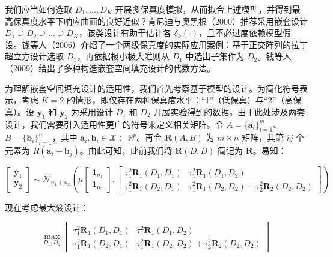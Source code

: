 \documentclass{ctexart}
\begin{document}
我们应当如何选取 $D_1,\dots,D_K$ 开展多保真度模拟，从而拟合上述模型，并得到最高保真度水平下响应曲面的良好近似？肯尼迪与奥黑根（2000）推荐采用嵌套设计 $D_1 \supseteq D_2 \supseteq \dots \supseteq D_K$，该类设计有助于估计各 $\delta_k(\cdot)$，且不必过度依赖模型假设。钱等人（2006）介绍了一个两级保真度的实际应用案例：基于正交阵列的拉丁超立方设计选取 $D_1$，再依据极小极大准则从 $D_1$ 中选出子集作为 $D_2$。钱等人（2009）给出了多种构造嵌套空间填充设计的代数方法。

为理解嵌套空间填充设计的适用性，我们首先考察基于模型的设计。为简化符号表示，考虑 $K=2$ 的情形，即仅存在两种保真度水平：“1”（低保真）与“2”（高保真）。设 $\boldsymbol{y}_1$ 和 $\boldsymbol{y}_2$ 为采用设计 $D_1$ 和 $D_2$ 开展实验得到的数据。由于此处涉及两套设计，我们需要引入适用性更广的符号来定义相关矩阵。令 $A = \{\boldsymbol{a}_i\}_{i=1}^m$、$B = \{\boldsymbol{b}_i\}_{i=1}^n$，其中 $\boldsymbol{a}_i,\boldsymbol{b}_i \in \mathcal{X} \subset \mathbb{R}^p$。再令 $\boldsymbol{R}(A,B)$ 为 $m\times n$ 矩阵，其第 $ij$ 个元素为 $R(\boldsymbol{a}_i-\boldsymbol{b}_j)$。由此可知，此前我们将 $\boldsymbol{R}(D,D)$ 简记为 $\boldsymbol{R}$。易知：

\begin{equation*}
\begin{bmatrix}
\boldsymbol{y}_1\\\boldsymbol{y}_2
\end{bmatrix}
\sim \mathcal{N}_{n_1+n_2}\left(\mu
\begin{bmatrix}
\boldsymbol{1}_{n_1}\\\boldsymbol{1}_{n_2}
\end{bmatrix},
\begin{bmatrix}
\tau_1^2 \boldsymbol{R}_1(D_1,D_1) & \tau_1^2 \boldsymbol{R}_1(D_1,D_2)\\
\tau_1^2 \boldsymbol{R}_1(D_2,D_1) & \tau_1^2 \boldsymbol{R}_1(D_2,D_2)+\tau_2^2 \boldsymbol{R}_2(D_2,D_2)
\end{bmatrix}\right)
\tag{4.37}
\end{equation*}

现在考虑最大熵设计：

\begin{equation*}
\max_{D_1,D_2}
\begin{vmatrix}
\tau_1^2 \boldsymbol{R}_1(D_1,D_1) & \tau_1^2 \boldsymbol{R}_1(D_1,D_2)\\
\tau_1^2 \boldsymbol{R}_1(D_2,D_1) & \tau_1^2 \boldsymbol{R}_1(D_2,D_2)+\tau_2^2 \boldsymbol{R}_2(D_2,D_2)
\end{vmatrix}
\end{equation*}
\end{document}

